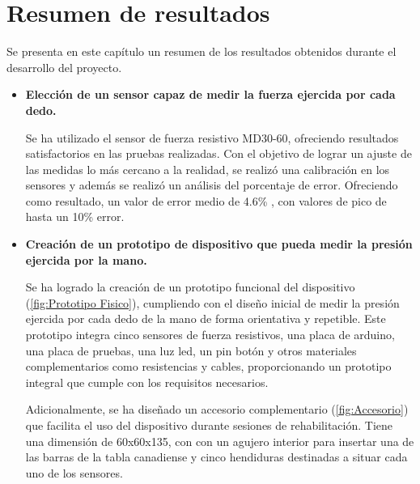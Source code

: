 
\section{Resumen de resultados}

Se presenta en este capítulo un resumen de los resultados obtenidos durante el desarrollo del proyecto. 
\begin{itemize}
    
    \item \textbf{Elección de un sensor capaz de medir la fuerza ejercida por cada dedo.}
    
    Se ha utilizado el sensor de fuerza resistivo MD30-60, ofreciendo resultados satisfactorios en las pruebas realizadas. Con el objetivo de lograr un ajuste de las medidas lo más cercano a la realidad, se realizó una  calibración en los sensores y además se realizó un análisis del porcentaje de error. Ofreciendo como resultado, un valor de error medio de 4.6\% , con valores de pico de hasta un 10\% error.
    
    \item \textbf{Creación de un prototipo de dispositivo que pueda medir la presión ejercida por la mano.}
    
    Se ha logrado la creación de un prototipo funcional del dispositivo (\ref{fig:Prototipo Fisico}), cumpliendo con el diseño inicial de medir la presión ejercida por cada dedo de la mano de forma orientativa y repetible. Este prototipo integra cinco sensores de fuerza resistivos, una placa de arduino, una placa de pruebas, una luz led, un pin botón y otros materiales complementarios como resistencias y cables, proporcionando un prototipo integral que cumple con los requisitos necesarios. 

    Adicionalmente, se ha diseñado un accesorio complementario (\ref{fig:Accesorio}) que facilita el uso del dispositivo durante sesiones de rehabilitación. Tiene una dimensión de 60x60x135, con con un agujero interior para insertar una de las barras de la
    tabla canadiense y cinco hendiduras destinadas a situar cada uno de los sensores.


\end{itemize}
